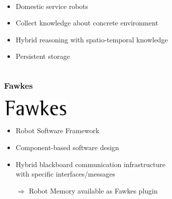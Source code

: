 \begin{frame}
\begin{columns}
\begin{column}{0.5\textwidth}
\begin{flushright}
    \end{flushright}
  \begin{description}[]
  \item[RoboCup@Home] \hfill \\
    \begin{itemize}
    \item Domestic service robots
    \item Collect knowledge about concrete environment
    \item Hybrid reasoning with spatio-temporal knowledge
    \item Persistent storage
    \end{itemize}
  \end{description}    
    \end{column}
  \end{columns}
  \end{frame}

\begin{frame}
  \frametitle{Fawkes}
  \includegraphics[width=0.25\textwidth]{../thesis/img/fawkes}  
  \bigskip
  \begin{itemize}
    \item Robot Software Framework %
    \item Component-based software design %
    \item Hybrid blackboard communication infrastructure\\ with specific interfaces/messages %
      \skip
    \item[$\Rightarrow$] Robot Memory available as Fawkes plugin
  \end{itemize}
\end{frame}

